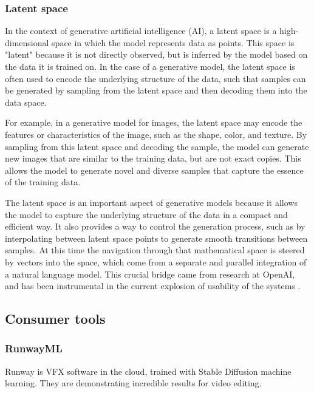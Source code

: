 \subsubsection{Latent space}
In the context of generative artificial intelligence (AI), a latent space is a high-dimensional space in which the model represents data as points. This space is "latent" because it is not directly observed, but is inferred by the model based on the data it is trained on. In the case of a generative model, the latent space is often used to encode the underlying structure of the data, such that samples can be generated by sampling from the latent space and then decoding them into the data space.

For example, in a generative model for images, the latent space may encode the features or characteristics of the image, such as the shape, color, and texture. By sampling from this latent space and decoding the sample, the model can generate new images that are similar to the training data, but are not exact copies. This allows the model to generate novel and diverse samples that capture the essence of the training data.

The latent space is an important aspect of generative models because it allows the model to capture the underlying structure of the data in a compact and efficient way. It also provides a way to control the generation process, such as by interpolating between latent space points to generate smooth transitions between samples. At this time the navigation through that mathematical space is steered by vectors into the space, which come from a separate and parallel integration of a natural language model. This crucial bridge came from research at OpenAI, and has been instrumental in the current explosion of usability of the systems \cite{radford2021learning}.
\subsection{Consumer tools}
\subsubsection{RunwayML}
Runway is VFX software in the cloud, trained with Stable Diffusion machine learning. They are demonstrating incredible results for video editing.
